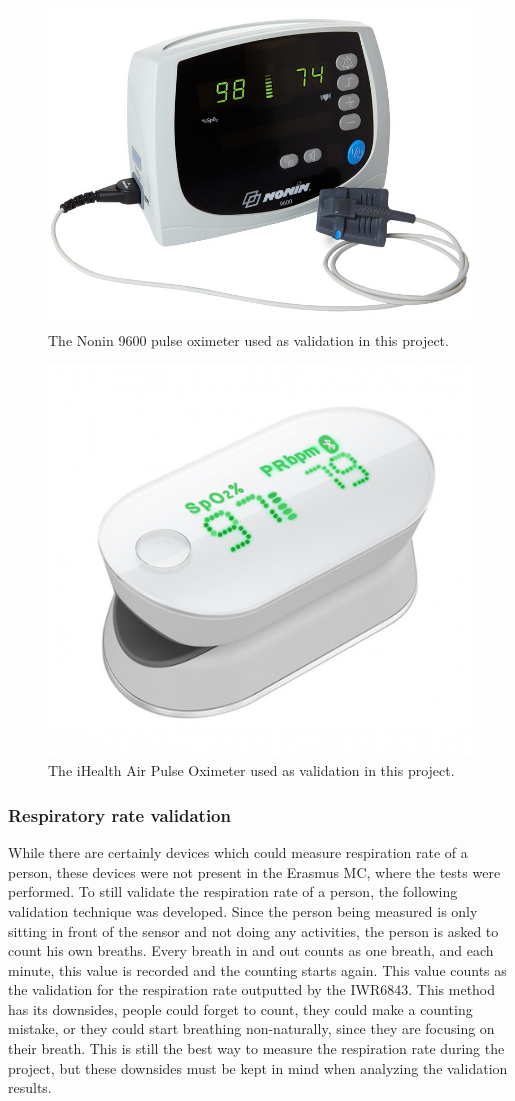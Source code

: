 \begin{figure}[t]
    \centering
    \includegraphics[width=.4\textwidth]{figures/validation/nonin_9600.jpg}
    \caption{The Nonin 9600 pulse oximeter used as validation in this project.}
    \label{fig:nonin_9600}
\end{figure}

\begin{figure}[t]
    \centering
    \includegraphics[width=.3\textwidth]{figures/validation/ihealth.jpg}
    \caption{The iHealth Air Pulse Oximeter used as validation in this project.}
    \label{fig:ihealth}
\end{figure}

\subsubsection{Respiratory rate validation}
While there are certainly devices which could measure respiration rate of a person, these devices were not present in the Erasmus MC, where the tests were performed. To still validate the respiration rate of a person, the following validation technique was developed. Since the person being measured is only sitting in front of the sensor and not doing any activities, the person is asked to count his own breaths. Every breath in and out counts as one breath, and each minute, this value is recorded and the counting starts again. This value counts as the validation for the respiration rate outputted by the IWR6843. This method has its downsides, people could forget to count, they could make a counting mistake, or they could start breathing non-naturally, since they are focusing on their breath. This is still the best way to measure the respiration rate during the project, but these downsides must be kept in mind when analyzing the validation results.


